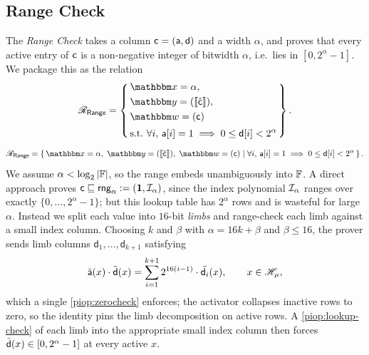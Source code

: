\subsection{Range Check}
The \emph{Range Check} takes a column $\mathsf{c} = (\mathsf{a}, \mathsf{d})$ and a width $\alpha$, and proves that every active entry of $\mathsf{c}$ is a non-negative integer of bitwidth $\alpha$, i.e.\ lies in $[0, 2^\alpha - 1]$. We package this as the relation
\ifsp
\begin{displaymath}
\NPRelation_{\mathsf{Range}} = \left\{\,
  \begin{aligned}
    & \NPInstance = \alpha,\\
    & \NPInstancey = (\Oracle{\hat{\col}}),\\
    & \NPWitness = (\col)\\[2pt]
    & \text{s.t.}\ \forall i,\, \mathsf{a}[i] = 1 \implies 0\leq \mathsf{d}[i] < 2^\alpha
  \end{aligned}
\,\right\}.
\end{displaymath}
\else
\begin{displaymath}
\NPRelation_{\mathsf{Range}} = \left\{\,
  \NPInstance = \alpha,\;
  \NPInstancey = (\Oracle{\hat{\col}}),\;
  \NPWitness = (\col)
  \;\middle|\;
    \forall i,\, \mathsf{a}[i] = 1 \implies 0\leq \mathsf{d}[i] < 2^\alpha
\,\right\}.
\end{displaymath}
\fi
We assume $\alpha < \log_2 |\mathbb{F}|$, so the range embeds unambiguously into $\mathbb{F}$. A direct approach proves $\mathsf{c} \sqsubseteq \mathsf{rng}_\alpha := (\mathbf{1}, \mathcal{I}_\alpha)$, since the index polynomial $\mathcal{I}_\alpha$ ranges over exactly $\{0, \ldots, 2^\alpha - 1\}$; but this lookup table has $2^\alpha$ rows and is wasteful for large $\alpha$. Instead we split each value into $16$-bit \emph{limbs} and range-check each limb against a small index column. Choosing $k$ and $\beta$ with $\alpha = 16k + \beta$ and $\beta \leq 16$, the prover sends limb columns $\mathsf{d}_1, \ldots, \mathsf{d}_{k+1}$ satisfying
\begin{displaymath}
  \tilde{\mathsf{a}}(x)\cdot\tilde{\mathsf{d}}(x) = \sum_{i=1}^{k+1} 2^{16(i-1)}\cdot\tilde{\mathsf{d}_i}(x), \qquad x \in \mathscr{H}_{\mu},
\end{displaymath}
which a single \cref{piop:zerocheck} enforces; the activator collapses inactive rows to zero, so the identity pins the limb decomposition on active rows. A \cref{piop:lookup-check} of each limb into the appropriate small index column then forces $\tilde{\mathsf{d}}(x) \in [0, 2^\alpha - 1]$ at every active $x$.

